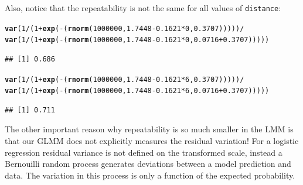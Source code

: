 \documentclass[12pt,a4paper]{scrartcl}\usepackage[]{graphicx}\usepackage[]{color}
\makeatletter
\newcommand{\hlnum}[1]{\textcolor[rgb]{0.686,0.059,0.569}{#1}}%
\newcommand{\hlopt}[1]{\textcolor[rgb]{0,0,0}{#1}}%
\newcommand{\hlstd}[1]{\textcolor[rgb]{0.345,0.345,0.345}{#1}}%
\newcommand{\hlkwd}[1]{\textcolor[rgb]{0.737,0.353,0.396}{\textbf{#1}}}%
\newenvironment{kframe}{%
 \def\at@end@of@kframe{}%
 \ifinner\ifhmode%
  \def\at@end@of@kframe{\end{minipage}}%
  \begin{minipage}{\columnwidth}%
 \fi\fi%
 \def\FrameCommand##1{\hskip\@totalleftmargin \hskip-\fboxsep
 \colorbox{shadecolor}{##1}\hskip-\fboxsep
     \hskip-\linewidth \hskip-\@totalleftmargin \hskip\columnwidth}%
 \MakeFramed {\advance\hsize-\width
   \@totalleftmargin\z@ \linewidth\hsize
   \@setminipage}}%
 {\par\unskip\endMakeFramed%
 \at@end@of@kframe}
\newenvironment{knitrout}{}{} %
\makeatother
\begin{document}
\begin{Answer}
Also, notice that the repeatability is not the same for all values of \texttt{distance}:
\begin{knitrout}
\color{fgcolor}\begin{kframe}
\begin{alltt}
\hlkwd{var}\hlstd{(}\hlnum{1}\hlopt{/}\hlstd{(}\hlnum{1}\hlopt{+}\hlkwd{exp}\hlstd{(}\hlopt{-}\hlstd{(}\hlkwd{rnorm}\hlstd{(}\hlnum{1000000}\hlstd{,} \hlnum{1.7448}\hlopt{-}\hlnum{0.1621}\hlopt{*}\hlnum{0}\hlstd{,} \hlnum{0.3707}\hlstd{)))))} \hlopt{/}
  \hlkwd{var}\hlstd{(}\hlnum{1}\hlopt{/}\hlstd{(}\hlnum{1}\hlopt{+}\hlkwd{exp}\hlstd{(}\hlopt{-}\hlstd{(}\hlkwd{rnorm}\hlstd{(}\hlnum{1000000}\hlstd{,} \hlnum{1.7448}\hlopt{-}\hlnum{0.1621}\hlopt{*}\hlnum{0}\hlstd{,} \hlnum{0.0716}\hlopt{+}\hlnum{0.3707}\hlstd{)))))}
\end{alltt}
\begin{verbatim}
## [1] 0.686
\end{verbatim}
\begin{alltt}
\hlkwd{var}\hlstd{(}\hlnum{1}\hlopt{/}\hlstd{(}\hlnum{1}\hlopt{+}\hlkwd{exp}\hlstd{(}\hlopt{-}\hlstd{(}\hlkwd{rnorm}\hlstd{(}\hlnum{1000000}\hlstd{,} \hlnum{1.7448}\hlopt{-}\hlnum{0.1621}\hlopt{*}\hlnum{6}\hlstd{,} \hlnum{0.3707}\hlstd{)))))} \hlopt{/}
  \hlkwd{var}\hlstd{(}\hlnum{1}\hlopt{/}\hlstd{(}\hlnum{1}\hlopt{+}\hlkwd{exp}\hlstd{(}\hlopt{-}\hlstd{(}\hlkwd{rnorm}\hlstd{(}\hlnum{1000000}\hlstd{,} \hlnum{1.7448}\hlopt{-}\hlnum{0.1621}\hlopt{*}\hlnum{6}\hlstd{,} \hlnum{0.0716}\hlopt{+}\hlnum{0.3707}\hlstd{)))))}
\end{alltt}
\begin{verbatim}
## [1] 0.711
\end{verbatim}
\end{kframe}
\end{knitrout}

The other important reason why repeatability is so much smaller in the LMM is that our GLMM does not explicitly measures the residual variation! For a logistic regression residual variance is not defined on the transformed scale, instead a Bernouilli random process generates deviations between a model prediction and data. The variation in this process is only a function of the expected probability.


\end{Answer}
\end{document}
